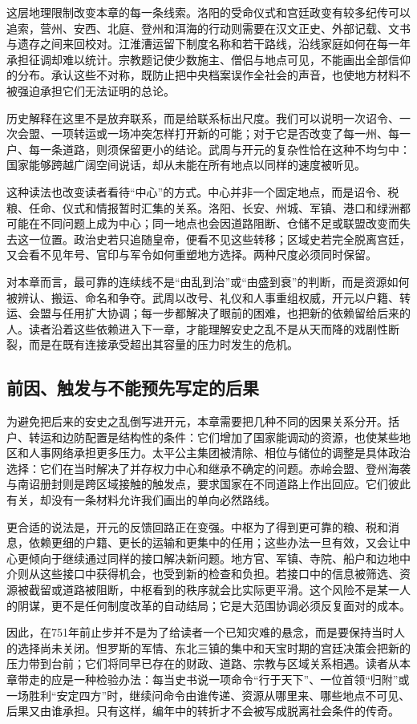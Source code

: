 这层地理限制改变本章的每一条线索。洛阳的受命仪式和宫廷政变有较多纪传可以追索，营州、安西、北庭、登州和洱海的行动则需要在汉文正史、外部记载、文书与遗存之间来回校对。江淮漕运留下制度名称和若干路线，沿线家庭如何在每一年承担征调却难以统计。宗教题记使少数施主、僧侣与地点可见，不能画出全部信仰的分布。承认这些不对称，既防止把中央档案误作全社会的声音，也使地方材料不被强迫承担它们无法证明的总论。

历史解释在这里不是放弃联系，而是给联系标出尺度。我们可以说明一次诏令、一次会盟、一项转运或一场冲突怎样打开新的可能；对于它是否改变了每一州、每一户、每一条道路，则须保留更小的结论。武周与开元的复杂性恰在这种不均匀中：国家能够跨越广阔空间说话，却从未能在所有地点以同样的速度被听见。

这种读法也改变读者看待“中心”的方式。中心并非一个固定地点，而是诏令、税粮、任命、仪式和情报暂时汇集的关系。洛阳、长安、州城、军镇、港口和绿洲都可能在不同问题上成为中心；同一地点也会因道路阻断、仓储不足或联盟改变而失去这一位置。政治史若只追随皇帝，便看不见这些转移；区域史若完全脱离宫廷，又会看不见年号、官印与军令如何重塑地方选择。两种尺度必须同时保留。

对本章而言，最可靠的连续线不是“由乱到治”或“由盛到衰”的判断，而是资源如何被辨认、搬运、命名和争夺。武周以改号、礼仪和人事重组权威，开元以户籍、转运、会盟与任用扩大协调；每一步都解决了眼前的困难，也把新的依赖留给后来的人。读者沿着这些依赖进入下一章，才能理解安史之乱不是从天而降的戏剧性断裂，而是在既有连接承受超出其容量的压力时发生的危机。

\subsection{前因、触发与不能预先写定的后果}
为避免把后来的安史之乱倒写进开元，本章需要把几种不同的因果关系分开。括户、转运和边防配置是结构性的条件：它们增加了国家能调动的资源，也使某些地区和人事网络承担更多压力。太平公主集团被清除、相位与储位的调整是具体政治选择：它们在当时解决了并存权力中心和继承不确定的问题。赤岭会盟、登州海袭与南诏册封则是跨区域接触的触发点，要求国家在不同道路上作出回应。它们彼此有关，却没有一条材料允许我们画出的单向必然路线。

更合适的说法是，开元的反馈回路正在变强。中枢为了得到更可靠的粮、税和消息，依赖更细的户籍、更长的运输和更集中的任用；这些办法一旦有效，又会让中心更倾向于继续通过同样的接口解决新问题。地方官、军镇、寺院、船户和边地中介则从这些接口中获得机会，也受到新的检查和负担。若接口中的信息被筛选、资源被截留或道路被阻断，中枢看到的秩序就会比实际更平滑。这个风险不是某一人的阴谋，更不是任何制度改革的自动结局；它是大范围协调必须反复面对的成本。

因此，在751年前止步并不是为了给读者一个已知灾难的悬念，而是要保持当时人的选择尚未关闭。怛罗斯的军情、东北三镇的集中和天宝时期的宫廷决策会把新的压力带到台前；它们将同早已存在的财政、道路、宗教与区域关系相遇。读者从本章带走的应是一种检验办法：每当史书说一项命令“行于天下”、一位首领“归附”或一场胜利“安定四方”时，继续问命令由谁传递、资源从哪里来、哪些地点不可见、后果又由谁承担。只有这样，编年中的转折才不会被写成脱离社会条件的传奇。
